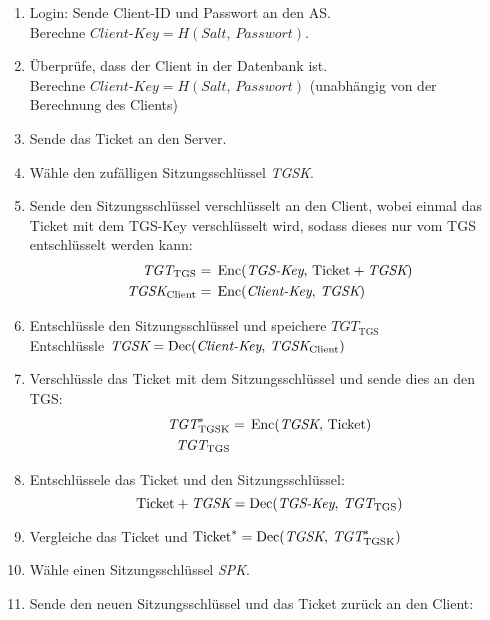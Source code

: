 		\begin{enumerate}
			\item Login: Sende Client-ID und Passwort an den AS. \\ Berechne \( \textit{Client-Key} = H(\textit{Salt},\, \textit{Passwort}) \).
			\item Überprüfe, dass der Client in der Datenbank ist. \\ Berechne \( \textit{Client-Key} = H(\textit{Salt},\, \textit{Passwort}) \) (unabhängig von der Berechnung des Clients)
			\item Sende das Ticket an den Server.
			\item Wähle den zufälligen Sitzungsschlüssel \textit{TGSK}.
			\item Sende den Sitzungsschlüssel verschlüsselt an den Client, wobei einmal das Ticket mit dem TGS-Key verschlüsselt wird, sodass dieses nur vom TGS entschlüsselt werden kann:
				\begin{align*}
					\textit{TGT}_\textrm{TGS}     & =\, \operatorname{Enc}(\textit{TGS-Key},\, \textrm{Ticket}+\textit{TGSK}) \\
					\textit{TGSK}_\textrm{Client} & =\, \operatorname{Enc}(\textit{Client-Key},\, \textit{TGSK})
				\end{align*}
			\item Entschlüssle den Sitzungsschlüssel und speichere \( \textit{TGT}_\textrm{TGS} \) \\ Entschlüssle \( \textit{TGSK} = \operatorname{Dec}(\textit{Client-Key},\, \textit{TGSK}_\textrm{Client}) \)
			\item Verschlüssle das Ticket mit dem Sitzungsschlüssel und sende dies an den TGS:
				\begin{align*}
					\textit{TGT}^*_\textrm{TGSK} & =\, \operatorname{Enc}(\textit{TGSK},\, \textrm{Ticket}) \\
					\textit{TGT}_\textrm{TGS}    &
				\end{align*}
			\item Entschlüssele das Ticket und den Sitzungsschlüssel:
				\begin{equation*}
					\textrm{Ticket}+\textit{TGSK} = \operatorname{Dec}(\textit{TGS-Key},\, \textit{TGT}_\textrm{TGS})
				\end{equation*}
			\item Vergleiche das Ticket und \( \textrm{Ticket}^* = \operatorname{Dec}(\textit{TGSK},\, \textit{TGT}^*_\textrm{TGSK}) \)
			\item Wähle einen Sitzungsschlüssel \textit{SPK}.
			\item Sende den neuen Sitzungsschlüssel und das Ticket zurück an den Client:

\end{enumerate}
